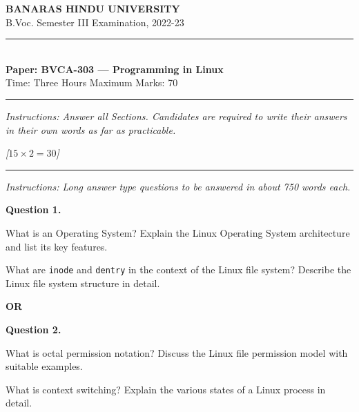 \documentclass[11pt,a4paper]{article}
\newcommand{\pts}[1]{\hfill   \textit{[#1]}}
\begin{document}
\begin{center}
  {\large\bfseries BANARAS HINDU UNIVERSITY}\\[2pt]
  {
\normalsize B.Voc. Semester III Examination, 2022-23}\\[6pt]
  \rule{0.8\linewidth}{0.5pt}\\[6pt]
  {\large\bfseries Paper: BVCA-303 --- Programming in Linux}\\[4pt]
  {
\normalsize Time: Three Hours \hfill Maximum Marks: 70}
\end{center}

\rule{\linewidth}{0.4pt}

\smallskip



\noindent   \textit{Instructions: Answer all Sections. Candidates are required to write their answers in their own words as far as practicable.}

\bigskip

\bigskip


\pts{$15  \times 2 = 30$}
\rule{\linewidth}{0.4pt}\smallskip




\noindent   \textit{Instructions: Long answer type questions to be answered in about 750 words each.}

\medskip


\noindent   \textbf{Question 1.}

\begin{parts}
  \item What is an Operating System? Explain the Linux Operating System architecture and list its key features.
  \item What are   \texttt{inode} and   \texttt{dentry} in the context of the Linux file system? Describe the Linux file system structure in detail.
\end{parts}
\centerline{   \textbf{OR}}

\medskip


\noindent   \textbf{Question 2.}

\begin{parts}
  \item What is octal permission notation? Discuss the Linux file permission model with suitable examples.
  \item What is context switching? Explain the various states of a Linux process in detail.
\end{parts}

\bigskip
\end{document}
